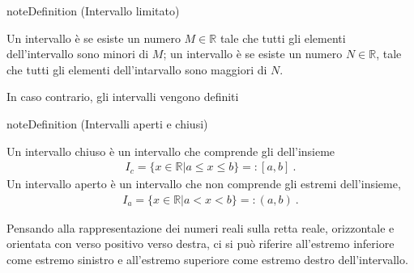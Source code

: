 \documentclass[letterpaper,10pt,italian]{jupyterBook}
\begin{document}
\label{None:interval-limited}
\begin{sphinxadmonition}{note}{Definition  (Intervallo limitato)}



\sphinxAtStartPar
Un intervallo è  se esiste un numero \(M \in \mathbb{R}\) tale che tutti gli elementi dell’intervallo sono minori di \(M\); un intervallo è  se esiste un numero \(N \in \mathbb{R}\), tale che tutti gli elementi dell’intarvallo sono maggiori di \(N\).

\sphinxAtStartPar
In caso contrario, gli intervalli vengono definiti 
\end{sphinxadmonition}
\label{None:interval-open-close}
\begin{sphinxadmonition}{note}{Definition  (Intervalli aperti e chiusi)}



\sphinxAtStartPar
Un intervallo chiuso è un intervallo che comprende gli  dell’insieme
\begin{equation*}
\begin{split}I_c = \{ x \in \mathbb{R} | a \le x \le b \} =: [a,b] \ .\end{split}
\end{equation*}
\sphinxAtStartPar
Un intervallo aperto è un intervallo che non comprende gli  estremi dell’insieme,
\begin{equation*}
\begin{split}I_a = \{ x \in \mathbb{R} | a < x < b \} =: (a,b) \ .\end{split}
\end{equation*}\end{sphinxadmonition}

\sphinxAtStartPar
Pensando alla rappresentazione dei numeri reali sulla retta reale, orizzontale e orientata con verso positivo verso destra, ci si può riferire all’estremo inferiore come estremo sinistro e all’estremo superiore come estremo destro dell’intervallo.
\end{document}
